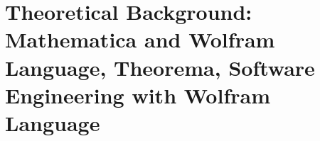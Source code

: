 \chapter{Theoretical Background: Mathematica and Wolfram Language, Theorema, Software Engineering with Wolfram Language}
\label{cha:Theory}


